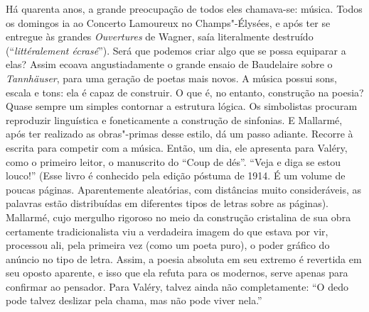 Há quarenta anos, a grande preocupação de todos eles chamava-se: música.
Todos os domingos ia ao Concerto Lamoureux no Champs"-Élysées, e após ter se entregue às 
grandes \emph{Ouvertures} de Wagner, saía literalmente destruído (``\emph{littéralement %
écrasé}''). Será que podemos criar algo que se possa equiparar
a elas? Assim ecoava angustiadamente o grande ensaio de Baudelaire
sobre o \emph{Tannhäuser}, para uma geração de poetas mais novos. A música possui
sons, escala e tons: ela é capaz de construir. O que é, no entanto,
construção na poesia? Quase sempre um simples contornar a estrutura
lógica. Os simbolistas procuram reproduzir linguística e foneticamente a
construção de sinfonias. E Mallarmé, após ter realizado as obras"-primas
desse estilo, dá um passo adiante. Recorre à
escrita para competir com a música. Então, um dia, ele apresenta para
Valéry, como o primeiro leitor, o manuscrito do ``Coup de dés''. ``Veja
e diga se estou louco!'' (Esse livro é conhecido pela edição póstuma de
1914. É um volume de poucas páginas. Aparentemente aleatórias,
com distâncias muito consideráveis, as palavras estão distribuídas em
diferentes tipos de letras sobre as páginas). Mallarmé, cujo mergulho
rigoroso no meio da construção cristalina de sua obra certamente
tradicionalista viu a verdadeira imagem do que estava por vir, processou
ali, pela primeira vez (como um poeta puro), o poder gráfico do anúncio
no tipo de letra. Assim, a poesia absoluta em seu extremo é revertida em seu oposto
aparente, e isso que ela refuta para os modernos, serve apenas para confirmar ao pensador. Para Valéry, talvez ainda não completamente: ``O dedo
pode talvez deslizar pela chama, mas não pode viver nela.''

